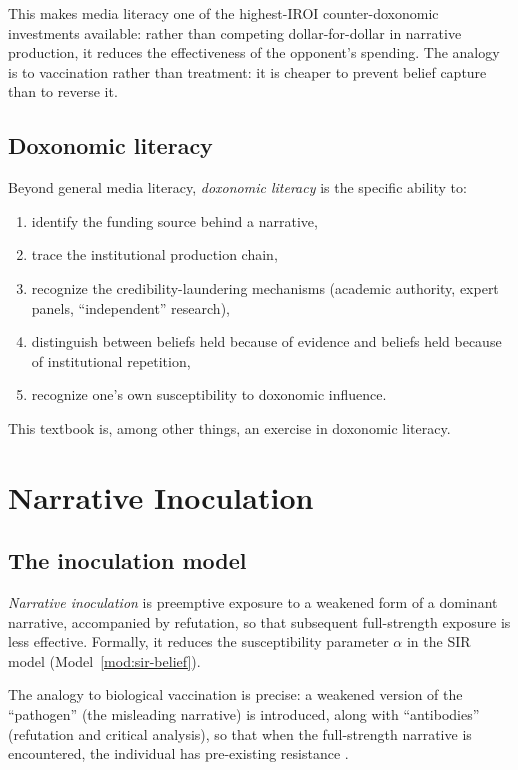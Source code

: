 This makes media literacy one of the highest-IROI counter-doxonomic investments available: rather than competing dollar-for-dollar in narrative production, it reduces the effectiveness of the opponent's spending.
The analogy is to vaccination rather than treatment: it is cheaper to prevent belief capture than to reverse it.

\subsection{Doxonomic literacy}

Beyond general media literacy, \emph{doxonomic literacy} is the specific ability to:
\begin{enumerate}[nosep]
  \item identify the funding source behind a narrative,
  \item trace the institutional production chain,
  \item recognize the credibility-laundering mechanisms (academic authority, expert panels, ``independent'' research),
  \item distinguish between beliefs held because of evidence and beliefs held because of institutional repetition,
  \item recognize one's own susceptibility to doxonomic influence.
\end{enumerate}

This textbook is, among other things, an exercise in doxonomic literacy.

\section{Narrative Inoculation}
\label{sec:ch31-inoculation}

\subsection{The inoculation model}

\begin{definition}
\label{def:inoculation}
\emph{Narrative inoculation} is preemptive exposure to a weakened form of a dominant narrative, accompanied by refutation, so that subsequent full-strength exposure is less effective.
Formally, it reduces the susceptibility parameter $\alpha$ in the SIR model (Model~\ref{mod:sir-belief}).
\end{definition}

The analogy to biological vaccination is precise: a weakened version of the ``pathogen'' (the misleading narrative) is introduced, along with ``antibodies'' (refutation and critical analysis), so that when the full-strength narrative is encountered, the individual has pre-existing resistance \autocite{mcguire1964, vanderlinden2022}.

